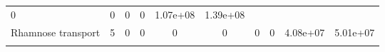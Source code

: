 \documentclass[]{article}
\begin{document}
\begin{longtable}[]{@{}lccccccccc@{}}
\begin{minipage}[t]{0.08\columnwidth}
0\strut
\end{minipage} & \begin{minipage}[t]{0.08\columnwidth}\centering\strut
0\strut
\end{minipage} & \begin{minipage}[t]{0.08\columnwidth}\centering\strut
0\strut
\end{minipage} & \begin{minipage}[t]{0.08\columnwidth}\centering\strut
0\strut
\end{minipage} & \begin{minipage}[t]{0.08\columnwidth}\centering\strut
1.07e+08\strut
\end{minipage} & \begin{minipage}[t]{0.08\columnwidth}\centering\strut
1.39e+08\strut
\end{minipage}\tabularnewline
\begin{minipage}[t]{0.07\columnwidth}\raggedright\strut
Rhamnose transport\strut
\end{minipage} & \begin{minipage}[t]{0.06\columnwidth}\centering\strut
5\strut
\end{minipage} & \begin{minipage}[t]{0.08\columnwidth}\centering\strut
0\strut
\end{minipage} & \begin{minipage}[t]{0.08\columnwidth}\centering\strut
0\strut
\end{minipage} & \begin{minipage}[t]{0.08\columnwidth}\centering\strut
0\strut
\end{minipage} & \begin{minipage}[t]{0.08\columnwidth}\centering\strut
0\strut
\end{minipage} & \begin{minipage}[t]{0.08\columnwidth}\centering\strut
0\strut
\end{minipage} & \begin{minipage}[t]{0.08\columnwidth}\centering\strut
0\strut
\end{minipage} & \begin{minipage}[t]{0.08\columnwidth}\centering\strut
4.08e+07\strut
\end{minipage} & \begin{minipage}[t]{0.08\columnwidth}\centering\strut
5.01e+07\strut
\end{minipage}\tabularnewline
\begin{minipage}[t]{0.07\columnwidth}\raggedright\strut

\end{minipage}
\end{longtable}
\end{document}
